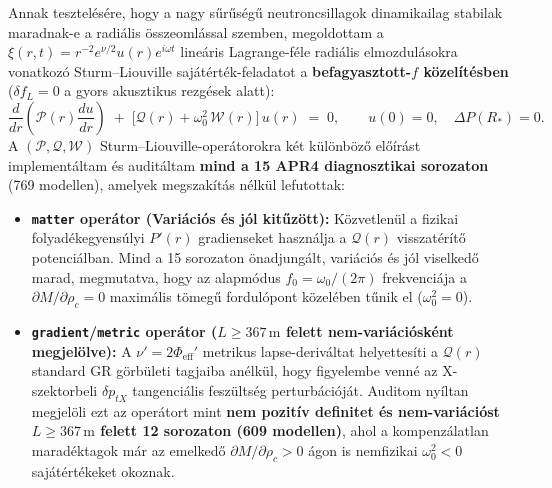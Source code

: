 \par
Annak tesztel\'es\'ere, hogy a nagy s\H{u}r\H{u}s\'eg\H{u} neutroncsillagok dinamikailag stabilak maradnak-e a radi\'alis \"osszeoml\'assal szemben, megoldottam a $\xi(r,t) = r^{-2}e^{\nu/2}u(r)e^{i\omega t}$ line\'aris Lagrange-f\'ele radi\'alis elmozdul\'asokra vonatkoz\'o Sturm--Liouville saj\'at\'ert\'ek-feladatot a \textbf{befagyasztott-$f$ k\"ozel\'it\'esben} ($\delta f_L = 0$ a gyors akusztikus rezg\'esek alatt):
\begin{equation}
  \frac{d}{dr}\!\left(\mathcal{P}(r)\frac{du}{dr}\right) \;+\; \bigl[\mathcal{Q}(r) + \omega_0^2\,\mathcal{W}(r)\bigr]\,u(r) \;=\; 0, \qquad u(0)=0,\quad \Delta P(R_*)=0.
\end{equation}
A $(\mathcal{P}, \mathcal{Q}, \mathcal{W})$ Sturm--Liouville-oper\'atorokra k\'et k\"ul\"onb\"oz\H{o} el\H{o}\'ir\'ast implement\'altam \'es audit\'altam \textbf{mind a 15 APR4 diagnosztikai sorozaton} (769 modellen), amelyek megszak\'it\'as n\'elk\"ul lefutottak:
\begin{itemize}\setlength{\itemsep}{1.5pt}\setlength{\parskip}{0pt}\setlength{\topsep}{1pt}
  \item \textbf{\texttt{matter} oper\'ator (Vari\'aci\'os \'es j\'ol kit\H{u}z\"ott):} K\"ozvetlen\"ul a fizikai folyad\'ekegyens\'ulyi $P'(r)$ gradienseket haszn\'alja a $\mathcal{Q}(r)$ visszat\'er\'it\H{o} potenci\'alban. Mind a 15 sorozaton \"onadjung\'alt, vari\'aci\'os \'es j\'ol viselked\H{o} marad, megmutatva, hogy az alapm\'odus $f_0 = \omega_0/(2\pi)$ frekvenci\'aja a $\partial M/\partial\rho_c = 0$ maxim\'alis t\"omeg\H{u} fordul\'opont k\"ozel\'eben t\H{u}nik el ($\omega_0^2 = 0$).
  \item \textbf{\texttt{gradient}/\texttt{metric} oper\'ator ($L \ge 367\,\text{m}$ felett nem-vari\'aci\'osk\'ent megjel\"olve):} A $\nu' = 2\Phi_{\text{eff}}'$ metrikus lapse-deriv\'altat helyettes\'iti a $\mathcal{Q}(r)$ standard GR g\"orb\"uleti tagjaiba an\'elk\"ul, hogy figyelembe venn\'e az X-szektorbeli $\delta p_{tX}$ tangenci\'alis fesz\"ults\'eg perturb\'aci\'oj\'at. Auditom ny\'iltan megjel\"oli ezt az oper\'atort mint \textbf{nem pozit\'iv definitet \'es nem-vari\'aci\'ost $L \ge 367\,\text{m}$ felett 12 sorozaton (609 modellen)}, ahol a kompenz\'alatlan marad\'ektagok m\'ar az emelked\H{o} $\partial M/\partial\rho_c > 0$ \'agon is nemfizikai $\omega_0^2 < 0$ saj\'at\'ert\'ekeket okoznak.
\end{itemize}

